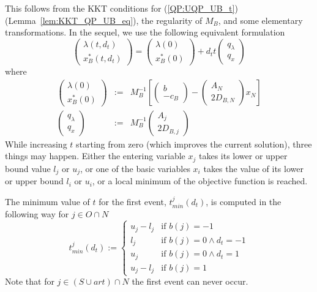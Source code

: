 \documentclass[a4paper]{article}
\begin{document}
This follows from the KKT conditions for (\ref{QP:UQP_UB_t})
(Lemma~\ref{lem:KKT_QP_UB_eq}), the regularity of $M_{B}$, and some elementary
transformations. In the sequel, we use the following equivalent formulation
\begin{equation}
\label{eq:Ratio_Test_1_Opt_sol_t}
\left(
\begin{array}{c}
\lambda(t, d_{t}) \\
\hline
x_{B}^{*}(t, d_{t})
\end{array}
\right)
=
\left(
\begin{array}{c}
\lambda(0) \\
\hline
x_{B}^{*}(0)
\end{array}
\right)
+
d_{t}t
\left(
\begin{array}{c}
q_{\lambda} \\
\hline
q_{x}
\end{array}
\right)
\end{equation}
where
\begin{eqnarray}
\left(
\begin{array}{c}
\lambda(0) \\
\hline
x_{B}^{*}(0)
\end{array}
\right)
&:=&
M_{B}^{-1}
\left[
\left(
\begin{array}{c}
b \\
\hline
-c_{B}
\end{array}
\right)
-
\left(
\begin{array}{c}
A_{N} \\
\hline
2D_{B,N}
\end{array}
\right)
x_{N}
\right]
\\
\left(
\begin{array}{c}
q_{\lambda} \\
\hline
q_{x}
\end{array}
\right)
&:=&
M_{B}^{-1}
\left(
\begin{array}{c}
A_{j} \\
\hline
2D_{B,j}
\end{array}
\right)
\end{eqnarray}
While increasing $t$ starting from zero (which improves the current solution),
three things may happen. Either the entering variable $x_{j}$ takes its lower or
upper bound value $l_{j}$ or $u_{j}$, or one of the basic variables $x_{i}$
takes the value of its lower or upper bound $l_{i}$ or $u_{i}$, or a local
minimum of the objective function is reached.

The minimum value of $t$ for the first event, $t_{min}^{j}(d_{t})$, is computed
in the following way for $j \in O \cap N$
\begin{equation}
\label{def:t_min_j}
t_{min}^{j}(d_{t}):=
\left\{
\begin{array}{ll}
u_{j}-l_{j}
&
\text{if $b(j)=-1$} \\
l_{j}
&
\text{if $b(j)=0 \wedge d_{t}=-1$} \\
u_{j}
&
\text{if $b(j)=0 \wedge d_{t}=1$} \\
u_{j}-l_{j}
&
\text{if $b(j)=1$}
\end{array}
\right.
\end{equation}
Note that for $j \in (S \cup art) \cap N$ the first event can never occur.
\end{document}
